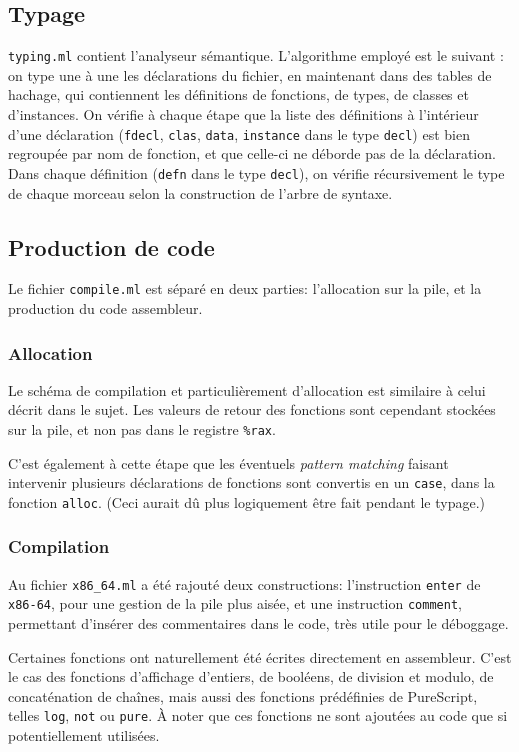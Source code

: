 \documentclass[12pt,a4paper]{article}
\begin{document}
\subsection{Typage}
\texttt{typing.ml} contient l'analyseur sémantique. L'algorithme employé est le suivant : on type une à une les déclarations du fichier, en maintenant dans des tables de hachage, qui contiennent les définitions de fonctions, de types, de classes et d'instances. On vérifie à chaque étape que la liste des définitions à l'intérieur d'une déclaration (\texttt{fdecl}, \texttt{clas}, \texttt{data}, \texttt{instance} dans le type \texttt{decl}) est bien regroupée par nom de fonction, et que celle-ci ne déborde pas de la déclaration. Dans chaque définition (\texttt{defn} dans le type \texttt{decl}), on vérifie récursivement le type de chaque morceau selon la construction de l'arbre de syntaxe. 

\subsection{Production de code}
Le fichier \texttt{compile.ml} est séparé en deux parties: l'allocation sur la pile, et la production du code assembleur.  

\subsubsection{Allocation}
Le schéma de compilation et particulièrement d'allocation est similaire à celui décrit dans le sujet. Les valeurs de retour des fonctions sont cependant stockées sur la pile, et non pas dans le registre \texttt{\%rax}.

C'est également à cette étape que les éventuels \emph{pattern matching} faisant intervenir plusieurs déclarations de fonctions sont convertis en un \texttt{case}, dans la fonction \texttt{alloc}. (Ceci aurait dû plus logiquement être fait pendant le typage.)

\subsubsection{Compilation}
Au fichier \texttt{x86\_64.ml} a été rajouté deux constructions: l'instruction \texttt{enter} de \texttt{x86-64}, pour une gestion de la pile plus aisée, et une instruction \texttt{comment}, permettant d'insérer des commentaires dans le code, très utile pour le déboggage. 

Certaines fonctions ont naturellement été écrites directement en assembleur. C'est le cas des fonctions d'affichage d'entiers, de booléens, de division et modulo, de concaténation de chaînes, mais aussi des fonctions prédéfinies de PureScript, telles \texttt{log}, \texttt{not} ou \texttt{pure}. À noter que ces fonctions ne sont ajoutées au code que si potentiellement utilisées.
\end{document}
